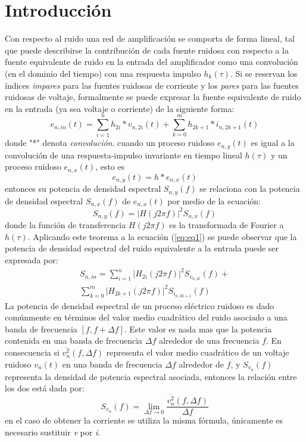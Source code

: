 \documentclass[letterpaper,10pt,twocolumn]{article}
\begin{document}
\section{Introducci\'on}
Con respecto al ruido una red de amplificaci\'on se comporta de forma lineal, tal que puede describirse la contribuci\'on de cada fuente ruidosa con respecto a la fuente equivalente de ruido en la entrada del amplificador como una convoluci\'on (en el dominio del tiempo) con una respuesta impulso $h_k(\tau)$. Si se reservan los \'indices {\it impares} para las fuentes ruidosas de corriente y los {\it pares} para las fuentes ruidosas de voltaje, formalmente se puede expresar la fuente equivalente de ruido en la entrada (ya sea voltaje o corriente) de la siguiente forma:
\begin{equation} \label{eq:eq1}
e_{n,in}(t)=\sum_{i=1}^nh_{2i}*v_{n,2i}(t)+\sum_{k=0}^mh_{2k+1}*i_{n,2k+1}(t)
\end{equation}
donde "*" denota {\it convoluci\'on}.
cuando un proceso ruidoso $e_{n,y}(t)$ es igual a la convoluci\'on de una respuesta-impulso invariante en tiempo lineal $h(\tau)$ y un proceso ruidoso $e_{n,x}(t)$, esto es 
\begin{equation}
e_{n,y}(t)=h*e_{n,x}(t) 
\end{equation}
entonces su potencia de densidad espectral $S_{n,y}(f)$ se relaciona con la potencia de densidad espectral $S_{n,x}(f)$ de $e_{n,x}(t)$ por medio de la ecuaci\'on:
\begin{equation}
S_{n,y}(f)=\lvert H(j2\pi f)\rvert^{2}S_{n,x}(f)
\end{equation}
donde la funci\'on de transferencia $H(j2\pi f)$ es la transformada de Fourier a $h(\tau)$. Aplicando este teorema a la ecuaci\'on (\ref{eq:eq1}) se puede observar que la potencia de densidad espectral del ruido equivalente a la entrada puede ser expresada por:
\begin{equation}
\begin{split}
S_{n,in}=\sum_{i=1}^n{\lvert}H_{2i}(j2{\pi}f){\rvert}^2S_{v_{n,2i}}(f)+\\
\sum_{k=0}^m{\lvert}H_{2k+1}(j2{\pi}f){\rvert^2}S_{i_{n,2k+1}}(f)
\end{split}
\end{equation} 
La potencia de densidad espectral de un proceso el\'ectrico ruidoso es dado com\'unmente en t\'erminos del valor medio cuadr\'atico del ruido asociado a una banda de frecuencia $[f,f+{\Delta}f]$. Este valor es nada mas que la potencia contenida en una banda de frecuencia ${\Delta}f$ alrededor de una frecuencia $f$. En consecuencia si $\overline{v_n^2}(f,{\Delta}f)$ representa el valor medio cuadr\'atico de un voltaje ruidoso $v_n(t)$ en una banda de frecuencia ${\Delta}f$ alrededor de $f$, y $S_{v_n}(f)$ representa la densidad de potencia espectral asociada, entonces la relaci\'on entre los dos est\'a dada por:
\begin{equation}
S_{v_n}(f)=\lim_{{\Delta}f \to 0}\frac{\overline{v_n^2}(f,{\Delta}f)}{{\Delta}f}
\end{equation}
en el caso de obtener la corriente se utiliza la misma f\'ormula, \'unicamente es necesario sustituir {\it v} por {\it i}.
\end{document}
